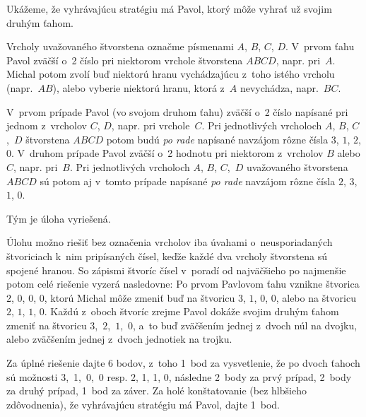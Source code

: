 {%
Ukážeme, že vyhrávajúcu stratégiu má Pavol, ktorý môže vyhrať už
svojim druhým ťahom.

Vrcholy uvažovaného štvorstena označme písmenami $A$, $B$, $C$, $D$.
V~prvom ťahu Pavol zväčší o~2 číslo pri niektorom vrchole štvorstena
$ABCD$, napr. pri~$A$. Michal potom zvolí buď niektorú hranu
vychádzajúcu z~toho istého vrcholu (napr.~$AB$),
alebo vyberie niektorú hranu, ktorá z~$A$ nevychádza, napr.~$BC$.

V~prvom prípade Pavol (vo svojom druhom ťahu) zväčší o~2 číslo napísané
pri jednom z~vrcholov $C$, $D$, napr. pri vrchole~$C$. Pri jednotlivých
vrcholoch $A$, $B$, $C$,~$D$ štvorstena $ABCD$ potom budú {\it po
rade\/} napísané navzájom rôzne čísla $3$, $1$, $2$, $0$. V~druhom prípade Pavol
zväčší o~2 hodnotu pri niektorom z~vrcholov $B$ alebo $C$, napr. pri~$B$.
Pri jednotlivých vrcholoch $A$, $B$, $C$,~$D$ uvažovaného štvorstena $ABCD$
sú potom aj v~tomto prípade napísané {\it po rade\/} navzájom rôzne
čísla $2$, $3$, $1$, $0$.

Tým je úloha vyriešená.

\poznamka
Úlohu možno riešiť bez označenia vrcholov iba úvahami o~neusporiadaných
štvoriciach k~nim pripísaných čísel, keďže každé dva vrcholy štvorstena
sú spojené hranou. So zápismi štvoríc čísel v~poradí od najväčšieho
po najmenšie potom celé riešenie vyzerá nasledovne:
Po prvom Pavlovom ťahu vznikne štvorica $2$, $0$, $0$, $0$, ktorú Michal
môže zmeniť
buď na štvoricu $3$, $1$, $0$, $0$, alebo na štvoricu $2$, $1$, $1$, $0$.
Každú z~oboch štvoríc zrejme Pavol dokáže svojim druhým ťahom zmeniť
na štvoricu $3$,~$2$,~$1$,~$0$, a~to buď zväčšením jednej z~dvoch núl na dvojku,
alebo zväčšením jednej z~dvoch jednotiek na trojku.

\nobreak\medskip\petit\noindent
Za úplné riešenie dajte 6 bodov, z~toho
1~bod za vysvetlenie, že po dvoch ťahoch sú možnosti 3,~1,~0,~0 resp. 2, 1, 1, 0,
následne 2~body za prvý prípad,
2~body za druhý prípad,
1~bod za záver.
Za holé konštatovanie (bez hlbšieho zdôvodnenia), že vyhrávajúcu stratégiu má Pavol,
dajte 1~bod.

\endpetit
\bigbreak
}

